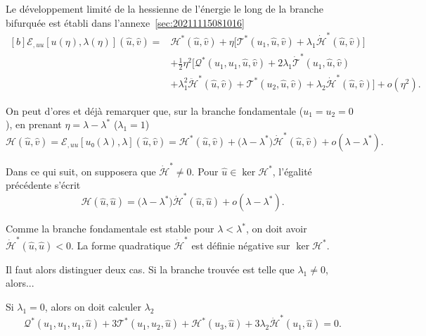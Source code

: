 \documentclass[12pt, final]{amsart}
\begin{document}
Le développement limité de la hessienne de l'énergie le long de la
branche bifurquée est établi dans l'annexe~\ref{sec:20211115081016}
\begin{equation}
  \label{eq:20211115082025}
  \begin{aligned}[b]
    ℰ_{,uu}[u(η), \lambda(η)](\hat{u}, \hat{v})
    ={}&\mathcal H^\ast(\hat{u}, \hat{v})
    +η\bigl[\mathcal T^\ast(u_1, \hat{u}, \hat{v})
    +\lambda_1\dot{\mathcal H}^\ast(\hat{u}, \hat{v})\bigr]\\
    &+\tfrac12η^2\bigl[\mathcal Q^\ast(u_1, u_1, \hat{u}, \hat{v})
    +2\lambda_1\dot{\mathcal T}^\ast(u_1, \hat{u}, \hat{v})\\
    &+\lambda_1^2\ddot{\mathcal H}^\ast(\hat{u}, \hat{v})
    +\mathcal T^\ast(u_2, \hat{u}, \hat{v})
    +\lambda_2\dot{\mathcal H}^\ast(\hat{u}, \hat{v})\bigr]+o(η^2).
  \end{aligned}
\end{equation}

On peut d'ores et déjà remarquer que, sur la branche fondamentale
(\(u_1=u_2=0\)), en prenant \(η=\lambda-\lambda^\ast\) (\(\lambda_1=1\))
\begin{equation}
  \mathcal H(\hat{u}, \hat{v})
  =ℰ_{,uu}[u₀(\lambda), \lambda](\hat{u}, \hat{v})
  =\mathcal H^\ast(\hat{u}, \hat{v})
  +\bigl(\lambda-\lambda^\ast\bigr)\dot{\mathcal H}^\ast(\hat{u}, \hat{v})
  +o(\lambda-\lambda^\ast).
\end{equation}

Dans ce qui suit, on supposera que \(\dot{\mathcal H}^\ast≠ 0\). Pour
\(\hat{u}∈\ker\mathcal H^\ast\), l'égalité précédente s'écrit
\begin{equation}
  \mathcal H(\hat{u}, \hat{u})
  =\bigl(\lambda-\lambda^\ast\bigr)\dot{\mathcal H}^\ast(\hat{u}, \hat{u})
  +o(\lambda-\lambda^\ast).
\end{equation}

Comme la branche fondamentale est stable pour \(\lambda<\lambda^\ast\), on doit
avoir \(\dot{\mathcal H}^\ast(\hat{u}, \hat{u})<0\). La forme quadratique
\(\dot{\mathcal H}^\ast\) est définie négative sur \(\ker\mathcal H^\ast\).


Il faut alors distinguer deux cas. Si la branche trouvée est telle que
\(\lambda_1≠0\), alors...

Si \(\lambda_1=0\), alors on doit calculer \(\lambda_2\)
\begin{equation}
  \mathcal Q^\ast(u_1, u_1, u_1, \hat{u})
  +3\mathcal T^\ast(u_1, u_2, \hat{u})+\mathcal H^\ast(u_3, \hat{u})
  +3\lambda_2\dot{\mathcal H}^\ast(u_1, \hat{u})=0.
\end{equation}
\end{document}
